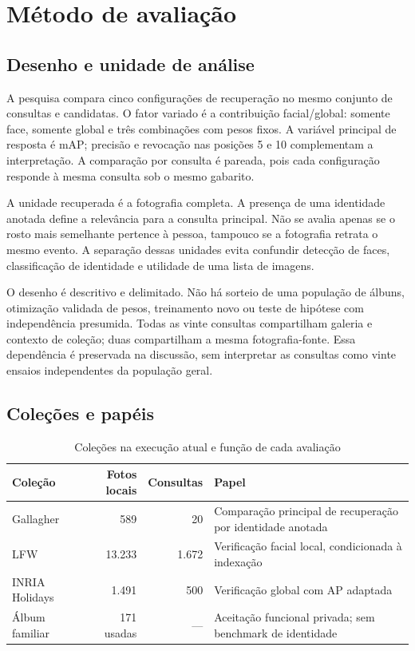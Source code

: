 \chapter{Método de avaliação}\label{cap:metodo}
\section{Desenho e unidade de análise}
A pesquisa compara cinco configurações de recuperação no mesmo conjunto de consultas e candidatas. O fator variado é a contribuição facial/global: somente face, somente global e três combinações com pesos fixos. A variável principal de resposta é mAP; precisão e revocação nas posições 5 e 10 complementam a interpretação. A comparação por consulta é pareada, pois cada configuração responde à mesma consulta sob o mesmo gabarito.

A unidade recuperada é a fotografia completa. A presença de uma identidade anotada define a relevância para a consulta principal. Não se avalia apenas se o rosto mais semelhante pertence à pessoa, tampouco se a fotografia retrata o mesmo evento. A separação dessas unidades evita confundir detecção de faces, classificação de identidade e utilidade de uma lista de imagens.

O desenho é descritivo e delimitado. Não há sorteio de uma população de álbuns, otimização validada de pesos, treinamento novo ou teste de hipótese com independência presumida. Todas as vinte consultas compartilham galeria e contexto de coleção; duas compartilham a mesma fotografia-fonte. Essa dependência é preservada na discussão, sem interpretar as consultas como vinte ensaios independentes da população geral.

\section{Coleções e papéis}
\begin{table}[htbp]\centering\small
\caption{Coleções na execução atual e função de cada avaliação}\label{tab:bases}
\begin{tabularx}{\textwidth}{lrrX}\toprule
Coleção & Fotos locais & Consultas & Papel\\\midrule
Gallagher & 589 & 20 & Comparação principal de recuperação por identidade anotada\\
LFW & 13.233 & 1.672 & Verificação facial local, condicionada à indexação\\
INRIA Holidays & 1.491 & 500 & Verificação global com AP adaptada\\
Álbum familiar & 171 usadas & --- & Aceitação funcional privada; sem benchmark de identidade\\\bottomrule
\end{tabularx}
\end{table}

